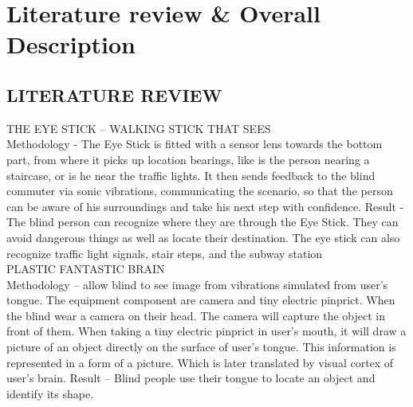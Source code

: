 
\chapter{Literature review & Overall Description} %

\label{Chapter2} %



\section{LITERATURE REVIEW}

THE EYE STICK – WALKING STICK THAT SEES\\
Methodology - The Eye Stick is fitted with a sensor lens towards the bottom part, from where it picks up location bearings, like is the person nearing a staircase, or is he near the traffic lights. It then sends feedback to the blind commuter via sonic vibrations, communicating the scenario, so that the person can be aware of his surroundings and take his next step with confidence.
Result - The blind person can recognize where they are through the Eye Stick. They can avoid dangerous things as well as locate their destination. The eye stick can also recognize traffic light signals, stair steps, and the subway station\\

PLASTIC FANTASTIC BRAIN\\
Methodology – allow blind to see image from vibrations simulated from user’s tongue. The equipment component are camera and tiny electric pinprict. When the blind wear a camera on their head. The camera will capture the object in front of them. When taking a tiny electric pinprict in user’s mouth, it will draw a picture of an object directly on the surface of user’s tongue. This information is represented in a form of a picture. Which is later translated by visual cortex of user’s brain.
Result – Blind people use their tongue to locate an object and identify its shape.



